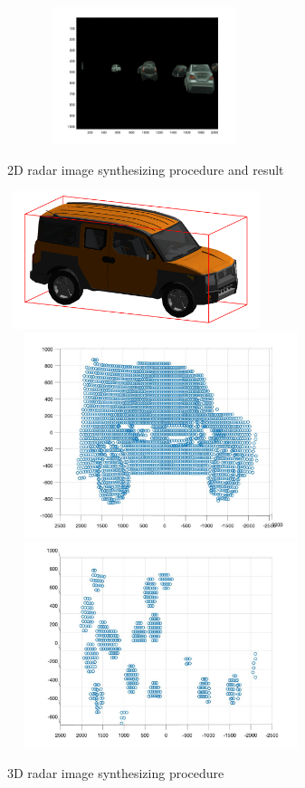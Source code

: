 \begin{figure}
	\includegraphics[width=8cm,height=4cm]{./figure/2d_select.jpg}\\
	\caption{2D radar image synthesizing procedure and result}
	\label{2D_synth}
\end{figure}

\begin{figure}
	\centering
	\includegraphics[width=7.5cm,height=4cm]{./figure/CAD.png}\\
	\includegraphics[width=9cm,height=6cm]{./figure/side.jpg}\\
	\includegraphics[width=9cm,height=6cm]{./figure/specular.jpg}\\
	\caption{3D radar image synthesizing procedure}
	\label{3D_synth}
\end{figure}

